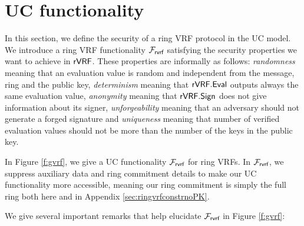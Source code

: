 \section{UC functionality}
In this section, we define the security of  a ring VRF protocol in the UC model. We introduce a ring VRF functionality $ \mathcal{F}_{\textsf{rvrf}} $ satisfying the security properties we want to achieve in $ {\mathsf{rVRF}} $. These properties are informally as follows: \emph{randomness} meaning that an evaluation value is random and independent from the message, ring and the public key, \emph{determinism} meaning that $ {\mathsf{rVRF}}.{\mathsf{Eval}} $ outputs always the same evaluation value, \emph{anonymity} meaning that $ {\mathsf{rVRF}}.{\mathsf{Sign}} $ does not give information about its signer, \emph{unforgeability} meaning that an adversary should not generate a forged signature and \emph{uniqueness} meaning that number of verified evaluation values should not be more than the number of the keys in the public key.

In Figure \ref{f:gvrf}, we give a UC functionality $\mathcal{F}_{\textsf{rvrf}}$ for ring VRFs.  In $\mathcal{F}_{\textsf{rvrf}}$, we suppress
auxiliary data and ring commitment details to make our UC functionality
more accessible, meaning our ring commitment is simply the full ring both
here and in Appendix \ref{sec:ringvrfconstrnoPK}.

We give several important remarks that help elucidate $\mathcal{F}_{\textsf{rvrf}}$ in Figure \ref{f:gvrf}:



